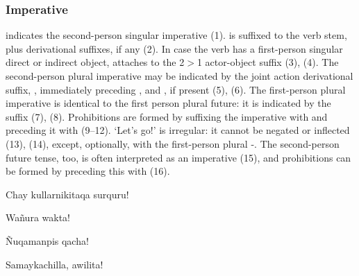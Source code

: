\subsubsection{Imperative }
 indicates the second-person singular imperative (1).  is suffixed to the verb stem, plus derivational suffixes, if any (2). In case the verb has a first-person singular direct or indirect object,  attaches to the 2$>$1 actor-object suffix  (3), (4). The second-person plural imperative may be indicated by the joint action derivational suffix, , immediately preceding , and , if present (5), (6). The first-person plural imperative is identical to the first person plural future: it is indicated by the suffix  (7), (8). Prohibitions are formed by suffixing the imperative with  and preceding it with  (9--12).  `Let's go!' is irregular: it cannot be negated or inflected (13), (14), except, optionally, with the first-person plural -. The second-person future tense, too, is often interpreted as an imperative (15), and prohibitions can be formed by preceding this with  (16).

%
{\textexclamdown{}Chay kullarnikitaqa surquru!}%
{}%
{}{}%

%
{\textexclamdown{}Wa\~nura wakta!}%
{}%
{}{}%

%
{\textexclamdown{}\~Nuqamanpis qacha!}%
{}%
{}{}%

%
{\textexclamdown{}Samaykachilla, awilita!}%
{}%
{}{}%

